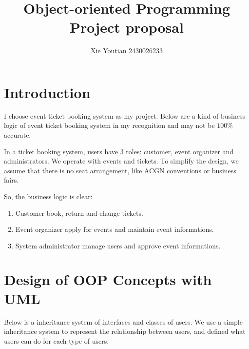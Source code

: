 \documentclass{article}
\title{Object-oriented Programming \\ Project proposal}
\author{Xie Youtian 2430026233}
\begin{document}
\maketitle
\section{Introduction}
I choose event ticket booking system as my project. 
Below are a kind of business logic of event ticket booking system 
in my recognition and may not be $100\%$ accurate.

In a ticket booking system, users have 3 roles: 
customer, event organizer and administrators. 
We operate with events and tickets.
To simplify the design, we assume that there is no seat arrangement, 
like ACGN conventions or business fairs. 

So, the business logic is clear:
\begin{enumerate}
    \item Customer book, return and change tickets.
    \item Event organizer apply for events and maintain event informations.
    \item System administrator manage users and approve event informations.
\end{enumerate}

\section{Design of OOP Concepts with UML}
Below is a inheritance system of interfaces and classes of users. We use a simple inheritance system to represent the relationship between users, 
and defined what users can do for each type of users.
\end{document}
